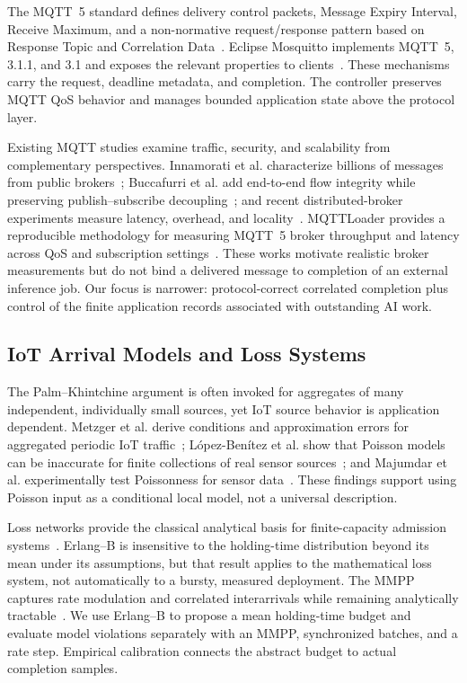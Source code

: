 \documentclass[journal]{IEEEtran}
\newcommand{\etal}{et al.}
\begin{document}
The MQTT~5 standard defines delivery control packets, Message Expiry Interval, Receive Maximum, and a non-normative request/response pattern based on Response Topic and Correlation Data~\cite{oasis2019mqtt}. Eclipse Mosquitto implements MQTT~5, 3.1.1, and 3.1 and exposes the relevant properties to clients~\cite{mosquitto2026manual}. These mechanisms carry the request, deadline metadata, and completion. The controller preserves MQTT QoS behavior and manages bounded application state above the protocol layer.

Existing MQTT studies examine traffic, security, and scalability from complementary perspectives. Innamorati \etal{} characterize billions of messages from public brokers~\cite{innamorati2026pulse}; Buccafurri \etal{} add end-to-end flow integrity while preserving publish--subscribe decoupling~\cite{buccafurri2024mqtt}; and recent distributed-broker experiments measure latency, overhead, and locality~\cite{rostamivand2025distributed}. MQTTLoader provides a reproducible methodology for measuring MQTT~5 broker throughput and latency across QoS and subscription settings~\cite{banno2021mqttloader}. These works motivate realistic broker measurements but do not bind a delivered message to completion of an external inference job. Our focus is narrower: protocol-correct correlated completion plus control of the finite application records associated with outstanding AI work.

\subsection{IoT Arrival Models and Loss Systems}

The Palm--Khintchine argument is often invoked for aggregates of many independent, individually small sources, yet IoT source behavior is application dependent. Metzger \etal{} derive conditions and approximation errors for aggregated periodic IoT traffic~\cite{metzger2019modeling}; L\'opez-Ben\'itez \etal{} show that Poisson models can be inaccurate for finite collections of real sensor sources~\cite{lopez2020aggregated}; and Majumdar \etal{} experimentally test Poissonness for sensor data~\cite{majumdar2019poissonness}. These findings support using Poisson input as a conditional local model, not a universal description.

Loss networks provide the classical analytical basis for finite-capacity admission systems~\cite{kelly1991loss}. Erlang--B is insensitive to the holding-time distribution beyond its mean under its assumptions, but that result applies to the mathematical loss system, not automatically to a bursty, measured deployment. The MMPP captures rate modulation and correlated interarrivals while remaining analytically tractable~\cite{fischer1993mmpp}. We use Erlang--B to propose a mean holding-time budget and evaluate model violations separately with an MMPP, synchronized batches, and a rate step. Empirical calibration connects the abstract budget to actual completion samples.
\end{document}
